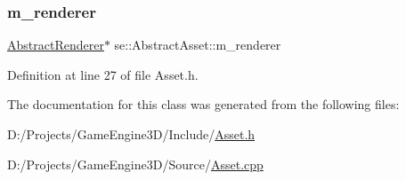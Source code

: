 \subsubsection{\texorpdfstring{m\+\_\+renderer}{m\_renderer}}
{\footnotesize\ttfamily \mbox{\hyperlink{classse_1_1_abstract_renderer}{Abstract\+Renderer}}$\ast$ se\+::\+Abstract\+Asset\+::m\+\_\+renderer\hspace{0.3cm}{\ttfamily [protected]}}



Definition at line 27 of file Asset.\+h.



The documentation for this class was generated from the following files\+:\begin{DoxyCompactItemize}
\item 
D\+:/\+Projects/\+Game\+Engine3\+D/\+Include/\mbox{\hyperlink{_asset_8h}{Asset.\+h}}\item 
D\+:/\+Projects/\+Game\+Engine3\+D/\+Source/\mbox{\hyperlink{_asset_8cpp}{Asset.\+cpp}}\end{DoxyCompactItemize}
